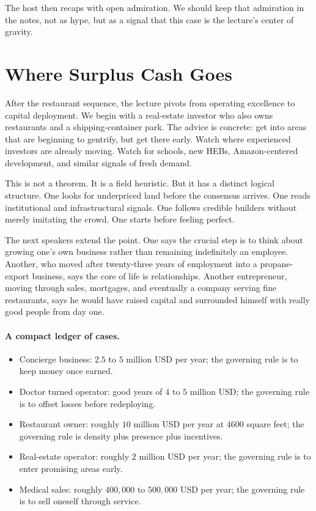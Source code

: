 The host then recaps with open admiration. We should keep that admiration in the notes, not as hype, but as a signal that this case is the lecture's center of gravity.

\section{Where Surplus Cash Goes}

After the restaurant sequence, the lecture pivots from operating excellence to capital deployment. We begin with a real-estate investor who also owns restaurants and a shipping-container park. The advice is concrete: get into areas that are beginning to gentrify, but get there early. Watch where experienced investors are already moving. Watch for schools, new HEBs, Amazon-centered development, and similar signals of fresh demand.

This is not a theorem. It is a field heuristic. But it has a distinct logical structure. One looks for underpriced land before the consensus arrives. One reads institutional and infrastructural signals. One follows credible builders without merely imitating the crowd. One starts before feeling perfect.

The next speakers extend the point. One says the crucial step is to think about growing one's own business rather than remaining indefinitely an employee. Another, who moved after twenty-three years of employment into a propane-export business, says the core of life is relationships. Another entrepreneur, moving through sales, mortgages, and eventually a company serving fine restaurants, says he would have raised capital and surrounded himself with really good people from day one.

\paragraph{A compact ledger of cases.}
\begin{itemize}
\item Concierge business: \(2.5\) to \(5\) million USD per year; the governing rule is to keep money once earned.
\item Doctor turned operator: good years of \(4\) to \(5\) million USD; the governing rule is to offset losses before redeploying.
\item Restaurant owner: roughly \(10\) million USD per year at \(4600\) square feet; the governing rule is density plus presence plus incentives.
\item Real-estate operator: roughly \(2\) million USD per year; the governing rule is to enter promising areas early.
\item Medical sales: roughly \(400{,}000\) to \(500{,}000\) USD per year; the governing rule is to sell oneself through service.
\end{itemize}

